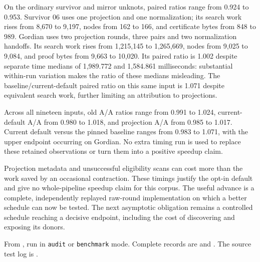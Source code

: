 On the ordinary survivor and mirror unknots, paired ratios range from
0.924 to 0.953. Survivor 06 uses one projection and one normalization;
its search work rises from 8,670 to 9,197, nodes from 162 to 166, and
certificate bytes from 848 to 989. Gordian uses two projection rounds,
three pairs and two normalization handoffs. Its search work rises from
1,215,145 to 1,265,669, nodes from 9,025 to 9,084, and proof bytes from
9,663 to 10,020. Its paired ratio is 1.002 despite separate time medians
of 1,989.772 and 1,584.861 milliseconds: substantial within-run variation
makes the ratio of these medians misleading. The baseline/current-default
paired ratio on this same input is 1.071 despite equivalent search work,
further limiting an attribution to projections.

Across all nineteen inputs, old A/A ratios range from 0.991 to 1.024,
current-default A/A from 0.980 to 1.018, and projection A/A from 0.985 to
1.017. Current default versus the pinned baseline ranges from 0.983 to
1.071, with the upper endpoint occurring on Gordian. No extra timing run
is used to replace these retained observations or turn them into a positive
speedup claim.

Projection metadata and unsuccessful eligibility scans can cost more than
the work saved by an occasional contraction. These timings justify the
opt-in default and give no whole-pipeline speedup claim for this corpus.
The useful advance is a complete, independently replayed raw-round
implementation on which a better schedule can now be tested. The next
asymptotic obligation remains a controlled schedule reaching a decisive
endpoint, including the cost of discovering and exposing its donors.

From , run 
in \texttt{audit} or \texttt{benchmark} mode. Complete records are
 and
.
The source test log is .
